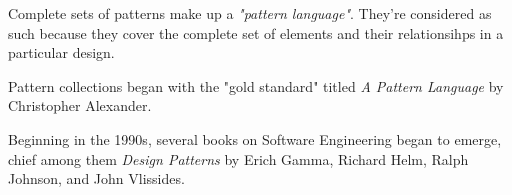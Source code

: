 Complete sets of patterns make up a \emph{"pattern language"}. They're considered as such because they cover the complete set of elements and their relationsihps in a particular design.

Pattern collections began with the "gold standard" titled \emph{A Pattern Language} by Christopher Alexander.

Beginning in the 1990s, several books on Software Engineering began to emerge, chief among them \emph{Design Patterns} by Erich Gamma, Richard Helm, Ralph Johnson, and John Vlissides.


